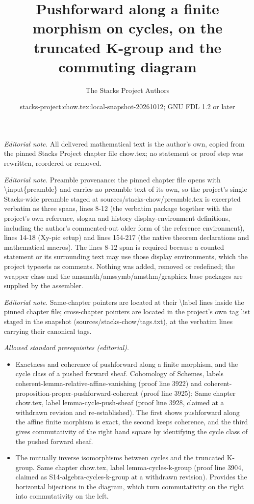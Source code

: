 \documentclass[10pt,a4paper]{amsart}
\title{Pushforward along a finite morphism on cycles, on the truncated K-group and the commuting diagram}
\author{The Stacks Project Authors}
\date{stacks-project:chow.tex:local-snapshot-20261012; GNU FDL 1.2 or later}
\theoremstyle{plain}
\theoremstyle{definition}
\theoremstyle{remark}
\numberwithin{equation}{subsection}
\begin{document}
\maketitle
\noindent\textit{Editorial note.} All delivered mathematical text is the author's own, copied from the pinned Stacks Project chapter file chow.tex; no statement or proof step was rewritten, reordered or removed.\par\medskip
\noindent\textit{Editorial note.} Preamble provenance: the pinned chapter file opens with \textbackslash{}input\{preamble\} and carries no preamble text of its own, so the project's single Stacks-wide preamble staged at sources/stacks-chow/preamble.tex is excerpted verbatim as three spans, lines 8-12 (the verbatim package together with the project's own reference, slogan and history display-environment definitions, including the author's commented-out older form of the reference environment), lines 14-18 (Xy-pic setup) and lines 154-217 (the native theorem declarations and mathematical macros). The lines 8-12 span is required because a counted statement or its surrounding text may use those display environments, which the project typesets as comments. Nothing was added, removed or redefined; the wrapper class and the amsmath/amssymb/amsthm/graphicx base packages are supplied by the assembler.\par\medskip
\noindent\textit{Editorial note.} Same-chapter pointers are located at their \textbackslash{}label lines inside the pinned chapter file; cross-chapter pointers are located in the project's own tag list staged in the snapshot (sources/stacks-chow/tags.txt), at the verbatim lines carrying their canonical tags.\par\medskip
\noindent\textit{Allowed standard prerequisites (editorial).}\begin{itemize}
\item Exactness and coherence of pushforward along a finite morphism, and the cycle class of a pushed forward sheaf. Cohomology of Schemes, labels coherent-lemma-relative-affine-vanishing (proof line 3922) and coherent-proposition-proper-pushforward-coherent (proof line 3925); Same chapter chow.tex, label lemma-cycle-push-sheaf (proof line 3928, claimed at a withdrawn revision and re-established). The first shows pushforward along the affine finite morphism is exact, the second keeps coherence, and the third gives commutativity of the right hand square by identifying the cycle class of the pushed forward sheaf.
\item The mutually inverse isomorphisms between cycles and the truncated K-group. Same chapter chow.tex, label lemma-cycles-k-group (proof line 3904, claimed as S14-algebra-cycles-k-group at a withdrawn revision). Provides the horizontal bijections in the diagram, which turn commutativity on the right into commutativity on the left.
\end{itemize}\medskip
\end{document}
